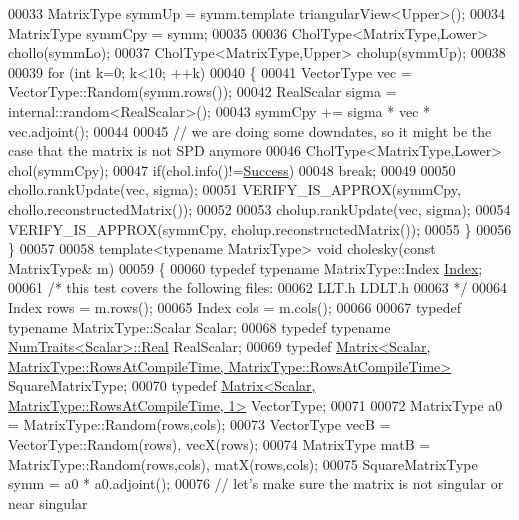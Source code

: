 \begin{DoxyCode}
00033   MatrixType symmUp = symm.template triangularView<Upper>();
00034   MatrixType symmCpy = symm;
00035 
00036   CholType<MatrixType,Lower> chollo(symmLo);
00037   CholType<MatrixType,Upper> cholup(symmUp);
00038 
00039   \textcolor{keywordflow}{for} (\textcolor{keywordtype}{int} k=0; k<10; ++k)
00040   \{
00041     VectorType vec = VectorType::Random(symm.rows());
00042     RealScalar sigma = internal::random<RealScalar>();
00043     symmCpy += sigma * vec * vec.adjoint();
00044 
00045     \textcolor{comment}{// we are doing some downdates, so it might be the case that the matrix is not SPD anymore}
00046     CholType<MatrixType,Lower> chol(symmCpy);
00047     \textcolor{keywordflow}{if}(chol.info()!=\hyperlink{group__enums_gga85fad7b87587764e5cf6b513a9e0ee5ea52581b035f4b59c203b8ff999ef5fcea}{Success})
00048       \textcolor{keywordflow}{break};
00049 
00050     chollo.rankUpdate(vec, sigma);
00051     VERIFY\_IS\_APPROX(symmCpy, chollo.reconstructedMatrix());
00052 
00053     cholup.rankUpdate(vec, sigma);
00054     VERIFY\_IS\_APPROX(symmCpy, cholup.reconstructedMatrix());
00055   \}
00056 \}
00057 
00058 \textcolor{keyword}{template}<\textcolor{keyword}{typename} MatrixType> \textcolor{keywordtype}{void} cholesky(\textcolor{keyword}{const} MatrixType& m)
00059 \{
00060   \textcolor{keyword}{typedef} \textcolor{keyword}{typename} MatrixType::Index \hyperlink{namespace_eigen_a62e77e0933482dafde8fe197d9a2cfde}{Index};
00061   \textcolor{comment}{/* this test covers the following files:}
00062 \textcolor{comment}{     LLT.h LDLT.h}
00063 \textcolor{comment}{  */}
00064   Index rows = m.rows();
00065   Index cols = m.cols();
00066 
00067   \textcolor{keyword}{typedef} \textcolor{keyword}{typename} MatrixType::Scalar Scalar;
00068   \textcolor{keyword}{typedef} \textcolor{keyword}{typename} \hyperlink{group___core___module_struct_eigen_1_1_num_traits}{NumTraits<Scalar>::Real} RealScalar;
00069   \textcolor{keyword}{typedef} 
      \hyperlink{group___core___module_class_eigen_1_1_matrix}{Matrix<Scalar, MatrixType::RowsAtCompileTime, MatrixType::RowsAtCompileTime>}
       SquareMatrixType;
00070   \textcolor{keyword}{typedef} \hyperlink{group___core___module_class_eigen_1_1_matrix}{Matrix<Scalar, MatrixType::RowsAtCompileTime, 1>} 
      VectorType;
00071 
00072   MatrixType a0 = MatrixType::Random(rows,cols);
00073   VectorType vecB = VectorType::Random(rows), vecX(rows);
00074   MatrixType matB = MatrixType::Random(rows,cols), matX(rows,cols);
00075   SquareMatrixType symm =  a0 * a0.adjoint();
00076   \textcolor{comment}{// let's make sure the matrix is not singular or near singular}

\end{DoxyCode}

